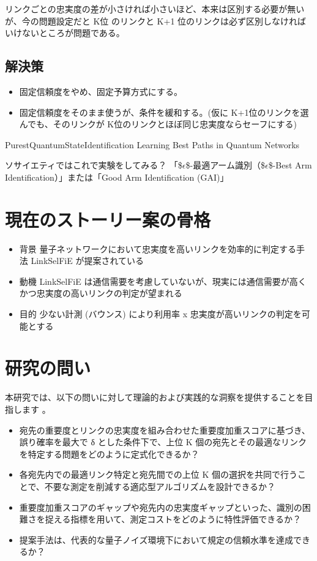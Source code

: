 \documentclass[conference]{IEEEtran}
\begin{document}
リンクごとの忠実度の差が小さければ小さいほど、本来は区別する必要が無い
が、今の問題設定だと K位 のリンクと K+1 位のリンクは必ず区別しなければ
いけないところが問題である。

\subsection{解決策}
\label{sec:org719fb60}
\begin{itemize}
\item 固定信頼度をやめ、固定予算方式にする。
\item 固定信頼度をそのまま使うが、条件を緩和する。(仮に K+1位のリンクを選
んでも、そのリンクが K位のリンクとほぼ同じ忠実度ならセーフにする)
\end{itemize}

PurestQuantumStateIdentification
Learning Best Paths in Quantum Networks


ソサイエティではこれで実験をしてみる？
「\$\(\epsilon\)\$-最適アーム識別（\$\(\epsilon\)\$-Best Arm Identification）」または「Good Arm Identification (GAI)」



\section{現在のストーリー案の骨格}
\label{sec:org3ebdcf5}

\begin{itemize}
\item 背景 量子ネットワークにおいて忠実度を高いリンクを効率的に判定する手法 LinkSelFiE が提案されている
\item 動機 LinkSelFiE は通信需要を考慮していないが、現実には通信需要が高くかつ忠実度の高いリンクの判定が望まれる
\item 目的 少ない計測 (バウンス) により利用率 x 忠実度が高いリンクの判定を可能とする
\end{itemize}


\section{研究の問い}
\label{sec:org9d54ac7}

本研究では、以下の問いに対して理論的および実践的な洞察を提供することを目指します 。

\begin{itemize}
\item 宛先の重要度とリンクの忠実度を組み合わせた重要度加重スコアに基づき、
誤り確率を最大で δ とした条件下で、上位 K 個の宛先とその最適なリンク
を特定する問題をどのように定式化できるか？

\item 各宛先内での最適リンク特定と宛先間での上位 K 個の選択を共同で行うこ
とで、不要な測定を削減する適応型アルゴリズムを設計できるか？

\item 重要度加重スコアのギャップや宛先内の忠実度ギャップといった、識別の困
難さを捉える指標を用いて、測定コストをどのように特性評価できるか？

\item 提案手法は、代表的な量子ノイズ環境下において規定の信頼水準を達成できるか？
\end{itemize}
\end{document}
